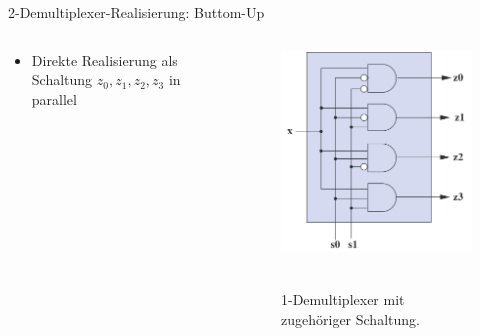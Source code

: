 \documentclass[12pt%
,xcolor=table
,aspectratio=169%
]{beamer}
\begin{document}
\begin{frame}{2-Demultiplexer-Realisierung: Buttom-Up}
\begin{columns}[T] %
\begin{column}{.6\textwidth}
\begin{itemize}
		\item Direkte Realisierung als Schaltung $z_0, z_1, z_2, z_3$ in parallel
	\end{itemize}
\end{column}%
\hfill%
\begin{column}{.48\textwidth}
\centering
\begin{figure}
\includegraphics[scale=0.3]{pictures/2demux_bu}\
\caption{1-Demultiplexer mit zugehöriger Schaltung.}
\end{figure}
\end{column}%
\end{columns}
\end{frame}
\end{document}
